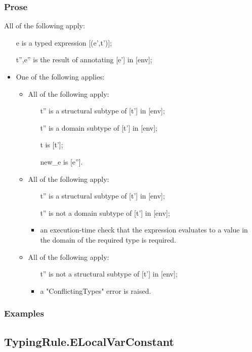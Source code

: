 \documentclass{book}
\begin{document}
  \subsubsection{Prose}
  All of the following apply:
  \begin{itemize}
  \item  [e] is a typed expression [(e',t')];
  \item  [t'',e''] is the result of annotating [e'] in [env];
  \item  One of the following applies:
    \begin{itemize}
    \item  All of the following apply:
      \begin{itemize}
      \item  [t''] is a structural subtype of [t'] in [env];
      \item  [t''] is a domain subtype of [t'] in [env];
      \item  [t] is [t'];
      \item  [new\_e] is [e''].
      \end{itemize}
    \item  All of the following apply:
      \begin{itemize}
      \item  [t''] is a structural subtype of [t'] in [env];
      \item  [t''] is not a domain subtype of [t'] in [env];
      \item  an execution-time check that the expression evaluates to a value in the
        domain of the required type is required.
      \end{itemize}
   \item  All of the following apply:
     \begin{itemize}
     \item  [t''] is not a structural subtype of [t'] in [env];
     \item  a "ConflictingTypes" error is raised.
     \end{itemize}
   \end{itemize}
  \end{itemize}

  \subsubsection{Examples}

\subsection{TypingRule.ELocalVarConstant}
\end{document}
